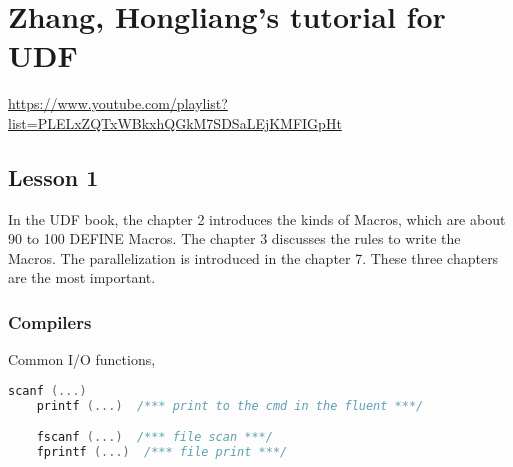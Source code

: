 \chapter{Zhang, Hongliang's tutorial for UDF}
\url{https://www.youtube.com/playlist?list=PLELxZQTxWBkxhQGkM7SDSaLEjKMFIGpHt}
\section{Lesson 1}
In the UDF book, the chapter 2 introduces the kinds of Macros, which are about 90 to 100 DEFINE Macros. 
The chapter 3 discusses the rules to write the Macros. 
The parallelization is introduced in the chapter 7. 
These three chapters are the most important.

\subsection{Compilers}
Common I/O functions,
\begin{lstlisting}[basicstyle=\small\conso, language=C]
    scanf (...)
    printf (...)  /*** print to the cmd in the fluent ***/

    fscanf (...)  /*** file scan ***/
    fprintf (...)  /*** file print ***/
\end{lstlisting}